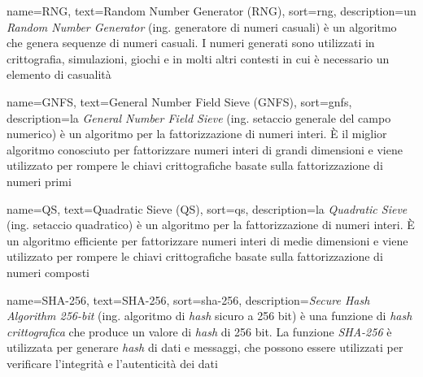  {
    name=RNG,
    text=Random Number Generator (RNG),
    sort=rng,
    description={un \emph{Random Number Generator} (ing. generatore di numeri casuali) è un algoritmo che genera sequenze di numeri casuali. I numeri generati sono utilizzati in crittografia, simulazioni, giochi e in molti altri contesti in cui è necessario un elemento di casualità}
}

 {
    name=GNFS,
    text=General Number Field Sieve (GNFS),
    sort=gnfs,
    description={la \emph{General Number Field Sieve} (ing. setaccio generale del campo numerico) è un algoritmo per la fattorizzazione di numeri interi. È il miglior algoritmo conosciuto per fattorizzare numeri interi di grandi dimensioni e viene utilizzato per rompere le chiavi crittografiche basate sulla fattorizzazione di numeri primi}
}

 {
    name=QS,
    text=Quadratic Sieve (QS),
    sort=qs,
    description={la \emph{Quadratic Sieve} (ing. setaccio quadratico) è un algoritmo per la fattorizzazione di numeri interi. È un algoritmo efficiente per fattorizzare numeri interi di medie dimensioni e viene utilizzato per rompere le chiavi crittografiche basate sulla fattorizzazione di numeri composti}
}

 {
    name=SHA-256,
    text=SHA-256,
    sort=sha-256,
    description={\emph{Secure Hash Algorithm 256-bit} (ing. algoritmo di \emph{hash} sicuro a 256 bit) è una funzione di \emph{hash crittografica} che produce un valore di \emph{hash} di 256 bit. La funzione \emph{SHA-256} è utilizzata per generare \emph{hash} di dati e messaggi, che possono essere utilizzati per verificare l'integrità e l'autenticità dei dati}
}